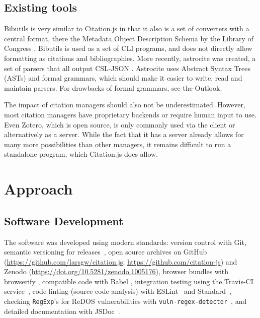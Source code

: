 \documentclass[fleqn,10pt,lineno]{wlpeerj} %
\begin{document}
\subsection*{Existing tools}

Bibutils is very similar to Citation.js in that it also is a set of converters with a central format, there the Metadata Object Description Schema by the Library of Congress \citep{putnam2005bibutils}. Bibutils is used as a set of CLI programs, and does not directly allow formatting as citations and bibliographies. More recently, astrocite was created, a set of parsers that all output CSL-JSON \citep{Sifford2019dsifford/astrocite}. Astrocite uses Abstract Syntax Trees (ASTs) and formal grammars, which should make it easier to write, read and maintain parsers. For drawbacks of formal grammars, see the Outlook.

The impact of citation managers should also not be underestimated. However, most citation managers have proprietary backends or require human input to use. Even Zotero, which is open source, is only commonly used via the client or alternatively as a server. While the fact that it has a server already allows for many more possibilities than other managers, it remains difficult to run a standalone program, which Citation.js does allow.

\section*{Approach}

\subsection*{Software Development}

The software was developed using modern standards: version control with Git, semantic versioning for releases~\citep{preston-werner_semantic_2013}, open source archives on GitHub (\url{https://github.com/larsgw/citation.js}; \url{https://github.com/citation-js}) and Zenodo (\url{https://doi.org/10.5281/zenodo.1005176}), browser bundles with browserify \citep{Halliday2018browserify/browserify}, compatible code with Babel \citep{Zhu2018babel/babel}, integration testing using the Travis-CI service~\citep{noauthor_travis_2018}, code linting (source code analysis) with ESLint~\citep{Zakas2018eslint/eslint} and Standard~\citep{Aboukhadijeh2018standard/standard}, checking \texttt{RegExp}'s for ReDOS vulnerabilities with \texttt{vuln-regex-detector}~\citep{davis_impact_2018}, and detailed documentation with JSDoc~\citep{Williams2018jsdoc3/jsdoc}.
\end{document}
